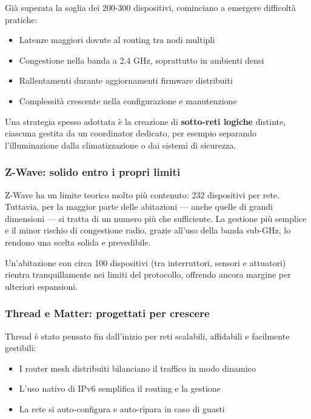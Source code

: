 Già superata la soglia dei 200-300 dispositivi, cominciano a emergere difficoltà pratiche:
\begin{itemize}
    \item Latenze maggiori dovute al routing tra nodi multipli
    \item Congestione nella banda a 2.4 GHz, soprattutto in ambienti densi
    \item Rallentamenti durante aggiornamenti firmware distribuiti
    \item Complessità crescente nella configurazione e manutenzione
\end{itemize}

Una strategia spesso adottata è la creazione di \textbf{sotto-reti logiche} distinte, ciascuna gestita da un coordinator dedicato, per esempio separando l’illuminazione dalla climatizzazione o dai sistemi di sicurezza.

\subsubsection{Z-Wave: solido entro i propri limiti}

Z-Wave ha un limite teorico molto più contenuto: 232 dispositivi per rete. Tuttavia, per la maggior parte delle abitazioni — anche quelle di grandi dimensioni — si tratta di un numero più che sufficiente. La gestione più semplice e il minor rischio di congestione radio, grazie all’uso della banda sub-GHz, lo rendono una scelta solida e prevedibile.

Un'abitazione con circa 100 dispositivi (tra interruttori, sensori e attuatori) rientra tranquillamente nei limiti del protocollo, offrendo ancora margine per ulteriori espansioni.

\subsubsection{Thread e Matter: progettati per crescere}

Thread è stato pensato fin dall’inizio per reti scalabili, affidabili e facilmente gestibili:
\begin{itemize}
    \item I router mesh distribuiti bilanciano il traffico in modo dinamico
    \item L'uso nativo di IPv6 semplifica il routing e la gestione
    \item La rete si auto-configura e auto-ripara in caso di guasti
\end{itemize}

